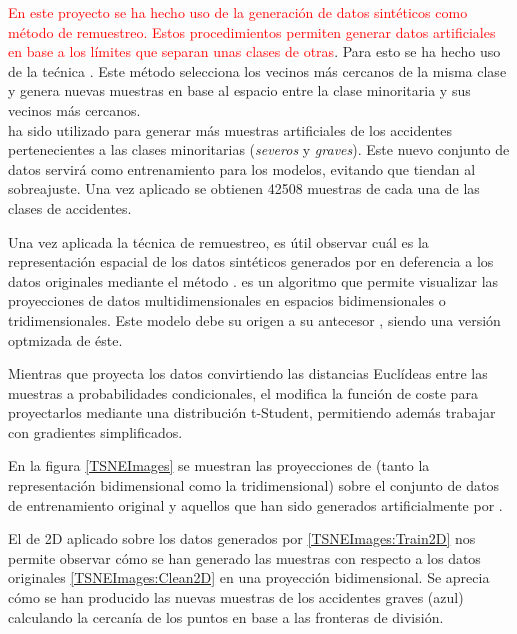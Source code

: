             \textcolor{red}{En este proyecto se ha hecho uso de la generación de datos sintéticos como método de remuestreo. Estos procedimientos permiten generar datos artificiales en base a los límites que separan unas clases de otras}. Para esto se ha hecho uso de la tećnica  \cite{SMOTEII}. Este método selecciona los vecinos más cercanos de la misma clase y genera nuevas muestras en base al espacio entre la clase minoritaria y sus vecinos más cercanos.\\

             ha sido utilizado para generar más muestras artificiales de los accidentes pertenecientes a las clases minoritarias (\textit{severos} y \textit{graves}). Este nuevo conjunto de datos servirá como entrenamiento para los modelos, evitando que tiendan al sobreajuste. Una vez aplicado  se obtienen 42508 muestras de cada una de las clases de accidentes.
    

            Una vez aplicada la técnica de remuestreo, es útil observar cuál es la representación espacial de los datos sintéticos generados por  en deferencia a los datos originales mediante el método  \cite{TSNEPaper}.  es un algoritmo que permite visualizar las proyecciones de datos multidimensionales en espacios bidimensionales o tridimensionales. Este modelo debe su origen a su antecesor , siendo una versión optmizada de éste.

            Mientras que  proyecta los datos convirtiendo las distancias Euclídeas entre las muestras a probabilidades condicionales, el  modifica la función de coste para proyectarlos mediante una distribución t-Student, permitiendo además trabajar con gradientes simplificados.


            En la figura \ref{TSNEImages} se muestran las proyecciones de  (tanto la representación bidimensional como la tridimensional) sobre el conjunto de datos de entrenamiento original y aquellos que han sido generados artificialmente por .

            El  de 2D aplicado sobre los datos generados por  \ref{TSNEImages:Train2D} nos permite observar cómo se han generado las muestras con respecto a los datos originales \ref{TSNEImages:Clean2D} en una proyección bidimensional. Se aprecia cómo se han producido las nuevas muestras de los accidentes graves (azul) calculando la cercanía de los puntos en base a las fronteras de división.


